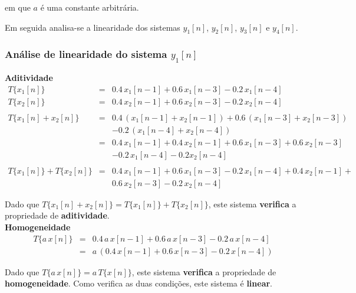 \documentclass[a4paper]{article}
\begin{document}
\noindent em que $a$ é uma constante arbitrária.

\noindent Em seguida analisa-se a linearidade dos sistemas $y_{1}[n]$, $y_{2}[n]$, $y_{3}[n]$ e $y_{4}[n]$.

\subsubsection{Análise de linearidade do sistema $y_{1}[n]$}
\noindent \textbf{Aditividade}
\begin{eqnarray}
	T\{x_{1}[n]\}					& = & 0.4 \, x_{1}[n - 1] + 0.6 \, x_{1}[n - 3] - 0.2 \, x_{1}[n - 4] \\
	T\{x_{2}[n]\}					& = & 0.4 \, x_{2}[n - 1] + 0.6 \, x_{2}[n - 3] - 0.2 \, x_{2}[n - 4] \\
	\nonumber \\
	T\{x_{1}[n] + x_{2}[n]\}		& = & 0.4 \, (x_{1}[n - 1] + x_{2}[n - 1]) + 0.6 \, (x_{1}[n - 3] + x_{2}[n - 3]) \nonumber \\ && - 0.2 \, (x_{1}[n - 4] + x_{2}[n - 4]) \\
									& = & 0.4 \, x_{1}[n - 1] + 0.4 \, x_{2}[n - 1] + 0.6 \, x_{1}[n - 3] + 0.6 \, x_{2}[n - 3] \nonumber \\ && - 0.2 \, x_{1}[n - 4] - 0.2 x_{2}[n - 4] \\
	\nonumber \\
	T\{x_{1}[n]\} + T\{x_{2}[n]\}	& = & 0.4 \, x_{1}[n - 1] + 0.6 \, x_{1}[n - 3] - 0.2 \, x_{1}[n - 4] + 0.4 \, x_{2}[n - 1] + \nonumber \\ && 0.6 \, x_{2}[n - 3] - 0.2 \, x_{2}[n - 4]
\end{eqnarray}

\noindent Dado que $T\{x_{1}[n] + x_{2}[n]\} = T\{x_{1}[n]\} + T\{x_{2}[n]\}$, este sistema \textbf{verifica} a propriedade de \textbf{aditividade}. \\

\noindent \textbf{Homogeneidade}
\begin{eqnarray}
	T\{a \, x[n]\}					& = & 0.4 \, a \, x[n - 1] + 0.6 \, a \, x[n - 3] - 0.2 \, a \, x[n - 4] \\
									& = & a \, (0.4 \, x[n - 1] + 0.6 \, x[n - 3] - 0.2 \, x[n - 4])
\end{eqnarray}

\noindent Dado que $T\{a \, x[n]\} = a \, T\{x[n]\}$, este sistema \textbf{verifica} a propriedade de \textbf{homogeneidade}. Como verifica as duas condições, este sistema é \textbf{linear}.
\end{document}
